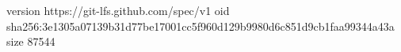 version https://git-lfs.github.com/spec/v1
oid sha256:3e1305a07139b31d77be17001cc5f960d129b9980d6c851d9cb1faa99344a43a
size 87544
